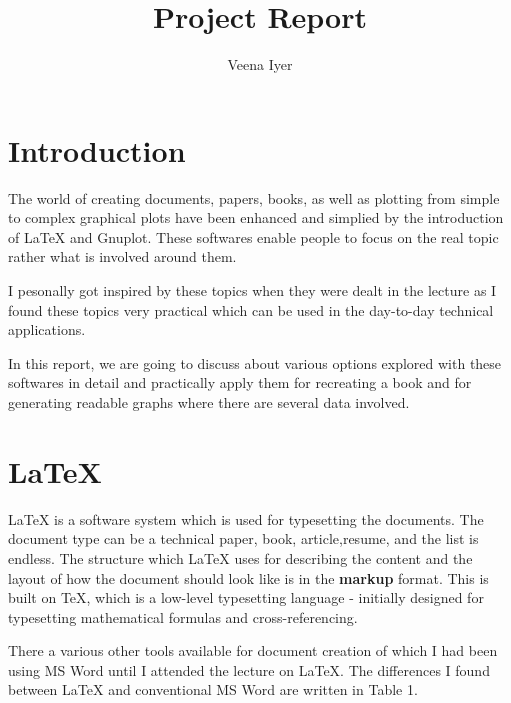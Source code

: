 \documentclass[runningheads]{llncs}
\begin{document}
%
\title{Project Report}

\author{Veena Iyer}

%
\maketitle              

\section{Introduction}
The world of creating documents, papers, books, as well as plotting from simple to complex graphical plots have been enhanced and simplied by the introduction of {\LaTeX} and Gnuplot. These softwares enable people to focus on the real topic rather what is involved around them. 

I pesonally got inspired by these topics when they were dealt in the lecture as I found these topics very practical which can be used in the day-to-day technical applications.

In this report, we are going to discuss about various options explored with these softwares in detail and practically apply them for recreating a book and for generating readable graphs where there are several data involved.


\section{\LaTeX}
{\LaTeX} is a software system which is used for typesetting the documents. The document type can be a technical paper, book, article,resume, and the list is endless. The structure which {\LaTeX} uses for describing the content and the layout of how the document should look like is in the \textbf{markup} format. This is built on \TeX, which is a low-level typesetting language - initially designed for typesetting mathematical formulas and cross-referencing. 

There a various other tools available for document creation of which I had been using MS Word until I attended the lecture on \LaTeX. The differences I found between {\LaTeX} and conventional MS Word are written in Table 1.
\end{document}
